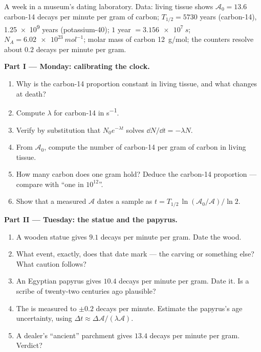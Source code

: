 \begin{problem}
\label{pb:g12:radioactive-decay:1}
A week in a museum's dating laboratory. Data: living tissue shows
$\mathcal A_0 = 13.6$ carbon-14 decays per minute per gram of carbon;
$T_{1/2} = \num{5730}$ years (carbon-14), \num{1.25e9} years
(potassium-40); $1$ year $= \qty{3.156e7}{s}$;
$N_A = \qty{6.02e23}{mol^{-1}}$; molar mass of carbon \qty{12}{g/mol};
the counters resolve about $0.2$ decays per minute per gram.

\medskip
\noindent\textbf{Part I --- Monday: calibrating the clock.}
\begin{enumerate}
  \item Why is the carbon-14 proportion constant in living tissue, and
        what changes at death?
  \item Compute $\lambda$ for carbon-14 in \unit{s^{-1}}.
  \item Verify by substitution that $N_0 e^{-\lambda t}$ solves
        $\dd N/\dd t = -\lambda N$.
  \item From $\mathcal A_0$, compute the number of carbon-14  per
        gram of carbon in living tissue.
  \item How many carbon  does one gram hold? Deduce the carbon-14
        proportion --- compare with ``one in $10^{12}$''.
  \item Show that a measured  $\mathcal A$ dates a sample as
        $t = T_{1/2}\,\ln(\mathcal A_0/\mathcal A)/\ln 2$.
\end{enumerate}

\medskip
\noindent\textbf{Part II --- Tuesday: the statue and the papyrus.}
\begin{enumerate}[resume]
  \item A wooden statue gives $9.1$ decays per minute per gram. Date the
        wood.
  \item What event, exactly, does that date mark --- the carving or
        something else? What caution follows?
  \item An Egyptian papyrus gives $10.4$ decays per minute per gram. Date
        it. Is a scribe of twenty-two centuries ago plausible?
  \item The  is measured to $\pm 0.2$ decays per minute. Estimate
        the papyrus's age uncertainty, using
        $\Delta t \approx \Delta\mathcal A/(\lambda \mathcal A)$.
  \item A dealer's ``ancient'' parchment gives $13.4$ decays per minute
        per gram. Verdict?
\end{enumerate}


\end{problem}
